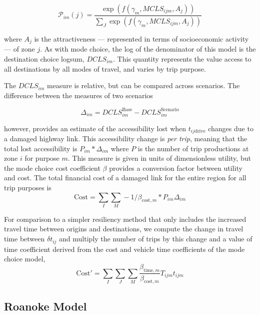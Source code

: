 \begin{equation}
\mathcal{P}_{im}(j) = \frac{\exp(f(\gamma_{m}, MCLS_{ijm},
A_j))}{\sum_{J}\exp(f(\gamma_{m}, MCLS_{ijm}, A_j))}
  \label{eq:dcp}
\end{equation}

where \(A_j\) is the attractiveness --- represented in terms of
socioeconomic activity --- of zone \(j\). As with mode choice, the log of the
denominator of this model is the destination
choice logsum, \(DCLS_{im}\). This quantity represents the value access to
all destinations
by all modes of travel, and varies by trip purpose.

The \(DCLS_{im}\) measure is relative, but can be compared across
scenarios. The difference between the measures of two scenarios

\begin{equation}
\Delta_{im} = DCLS_{im}^{\mathrm{Base}} - DCLS_{im}^{\mathrm{Scenario}}
  \label{eq:deltas}
\end{equation}

however, provides an estimate of the accessibility lost when
 \(t_{ij\mathrm{drive}}\)
changes due to a damaged highway link. This accessibility change is \emph{per
trip},
meaning that the total lost accessibility is \(P_{im} * \Delta_{im}\) where
\(P\) is
the number of trip productions at zone \(i\) for purpose \(m\). This measure is
given in units of dimensionless utility, but the mode choice cost coefficient
\(\beta\) provides a conversion factor between utility and cost. The total
financial
cost of a damaged link for the entire region for all trip purposes is
\begin{equation}
\mathrm{Cost} = \sum_{I}\sum_{M} -1 / \beta_{\mathrm{cost},m} * P_{im}
\Delta_{im}
  \label{eq:totalcost}
\end{equation}

For comparison to a simpler resiliency method that only includes the increased
travel time between origins and destinations, we compute the change in travel
time between \(\delta t_{ij}\) and multiply the number of trips by this change
and a value of time coefficient derived from the cost and vehicle time
coefficients
of the mode choice model,
\begin{equation}
\mathrm{Cost}' =  \sum_I \sum_J \sum_M \frac{\beta_{\mathrm{time}, m}
}{\beta_{\mathrm{cost}, m}} T_{ijm} t_{ijm}
  \label{eq:ttmethod}
\end{equation}

\subsection{Roanoke Model}

